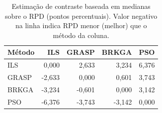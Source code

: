 \begin{table}[t]
\centering
\caption{Estimação de contraste baseada em medianas sobre o RPD (pontos percentuais). Valor negativo na linha indica RPD menor (melhor) que o método da coluna.}
\label{tab:contrast}
\footnotesize
\begin{tabular}{@{}lrrrr@{}}
\toprule
Método & ILS & GRASP & BRKGA & PSO \\
\midrule
ILS & 0,000 & 2,633 & 3,234 & 6,376 \\
GRASP & -2,633 & 0,000 & 0,601 & 3,743 \\
BRKGA & -3,234 & -0,601 & 0,000 & 3,142 \\
PSO & -6,376 & -3,743 & -3,142 & 0,000 \\
\bottomrule
\end{tabular}
\end{table}
